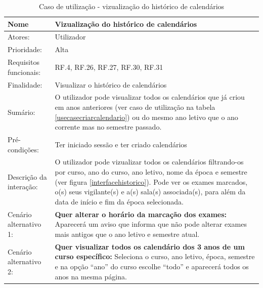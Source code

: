 \documentclass[11pt, twoside]{report}
\begin{document}
\def\arraystretch{1.5}
	\begin{table}[H]
	\caption{Caso de utilização - vizualização do histórico de calendários}
	\begin{center}	
		\begin{tabularx}{\textwidth}{|l|X|}
			\hline
			\textbf{Nome }	& \textbf{Vizualização do histórico de calendários} \\
			\hline
			Atores: & Utilizador \\
			\hline
			Prioridade: & Alta \\
			\hline
			Requisitos funcionais:&  RF.4, RF.26, RF.27, RF.30, RF.31\\
			\hline
			Finalidade: & Visualizar o histórico de calendários\\
			\hline
			Sumário: & O utilizador pode visualizar todos os calendários que já criou em anos anteriores (ver caso de utilização na tabela \ref{usecasecriarcalendario}) ou do mesmo ano letivo que o ano corrente mas no semestre passado. \\
			\hline
			Pré-condições: & Ter iniciado sessão e ter criado calendários\\
			\hline
			Descrição da interação: &  O utilizador pode vizualizar todos os calendários filtrando-os por curso, ano do curso, ano letivo, nome da época e semestre (ver figura \ref{interfacehistorico}). Pode ver os exames marcados, o(s) seus vigilante(s) e a(s) sala(s) associada(s), para além da data de início e fim da época selecionada.\\
			\hline
			Cenário alternativo 1:& \textbf{Quer alterar o horário da marcação dos exames:} Aparecerá um aviso que informa que não pode alterar exames mais antigos que o ano letivo e semestre atual.\\
			\hline
			Cenário alternativo 2:& \textbf{Quer visualizar todos os calendário dos 3 anos de um curso específico:} Seleciona o curso, ano letivo, época, semestre e na opção ``ano'' do curso escolhe ``todo'' e aparecerá todos os anos na mesma página.\\
			\hline
		\end{tabularx}
	\end{center}
\end{table}
\end{document}
